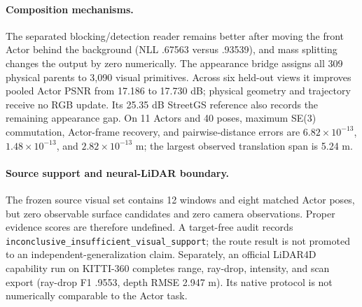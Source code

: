 \paragraph{Composition mechanisms.}
The separated blocking/detection reader remains better after moving the front Actor
behind the background (NLL .67563 versus .93539), and mass splitting changes the output
by zero numerically. The appearance bridge assigns all 309 physical parents to 3,090
visual primitives. Across six held-out views it improves pooled Actor PSNR from 17.186
to 17.730 dB; physical geometry and trajectory receive no RGB update. Its 25.35 dB
StreetGS reference also records the remaining appearance gap. On 11 Actors and 40
poses, maximum SE(3) commutation, Actor-frame recovery, and pairwise-distance errors are
$6.82\times10^{-13}$, $1.48\times10^{-13}$, and $2.82\times10^{-13}$ m; the largest
observed translation span is 5.24 m.

\paragraph{Source support and neural-LiDAR boundary.}
The frozen source visual set contains 12 windows and eight matched Actor poses, but zero
observable surface candidates and zero camera observations. Proper evidence scores are
therefore undefined. A target-free audit records
\texttt{inconclusive\_insufficient\_visual\_support}; the route result is not promoted
to an independent-generalization claim. Separately, an official LiDAR4D capability run
on KITTI-360 completes range, ray-drop, intensity, and scan export (ray-drop F1 .9553,
depth RMSE 2.947 m). Its native protocol is not numerically comparable to the Actor task.
